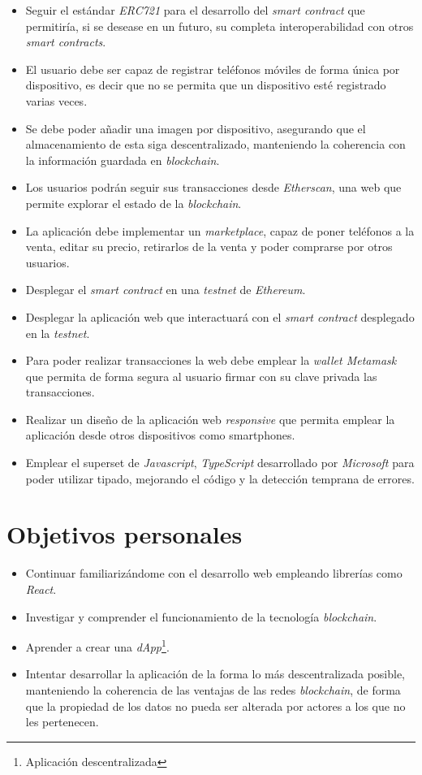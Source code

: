 \begin{itemize}
  \item Seguir el estándar \textit{ERC721} para el desarrollo del \textit{smart contract} que permitiría, si se desease en un futuro, su completa interoperabilidad con otros \textit{smart contracts}.
  \item El usuario debe ser capaz de registrar teléfonos móviles de forma única por dispositivo, es decir que no se permita que un dispositivo esté registrado varias veces.
  \item Se debe poder añadir una imagen por dispositivo, asegurando que el almacenamiento de esta siga descentralizado, manteniendo la coherencia con la información guardada en \textit{blockchain}.
  \item Los usuarios podrán seguir sus transacciones desde \textit{Etherscan}, una web que permite explorar el estado de la \textit{blockchain}.
  \item La aplicación debe implementar un \textit{marketplace}, capaz de poner teléfonos a la venta, editar su precio, retirarlos de la venta y poder comprarse por otros usuarios.
  \item Desplegar el \textit{smart contract} en una \textit{testnet} de \textit{Ethereum}.
  \item Desplegar la aplicación web que interactuará con el \textit{smart contract} desplegado en la \textit{testnet}.
  \item Para poder realizar transacciones la web debe emplear la \textit{wallet Metamask} que permita de forma segura al usuario firmar con su clave privada las transacciones.
  \item Realizar un diseño de la aplicación web \textit{responsive} que permita emplear la aplicación desde otros dispositivos como smartphones.
  \item Emplear el superset de \textit{Javascript}, \textit{TypeScript} desarrollado por \textit{Microsoft} para poder utilizar tipado, mejorando el código y la detección temprana de errores.
\end{itemize}

\section{Objetivos personales}
\begin{itemize}
  \item Continuar familiarizándome con el desarrollo web empleando librerías como \textit{React}.
  \item Investigar y comprender el funcionamiento de la tecnología \textit{blockchain}.
  \item Aprender a crear una \textit{dApp}\footnote{Aplicación descentralizada}.
  \item Intentar desarrollar la aplicación de la forma lo más descentralizada posible, manteniendo la coherencia de las ventajas de las redes \textit{blockchain}, de forma que la propiedad de los datos no pueda ser alterada por actores a los que no les pertenecen.
\end{itemize}

